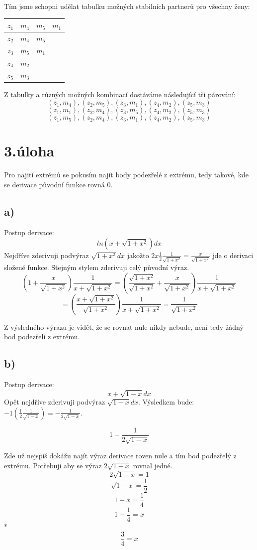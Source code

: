 \documentclass[a4paper, 11pt]{article}
\begin{document}
  Tím jsme schopni udělat tabulku možných stabilních partnerů pro všechny ženy:
  
  \begin{table}[h]
    \begin{tabular}{|l||l|l|l|}
    \hline
      $z_1$& $m_4$ & $m_5$  & $m_1$\\ \hline
      $z_2$& $m_4$ & $m_5$ &\\ \hline
      $z_3$& $m_5$ & $m_1$ &\\ \hline
      $z_4$& $m_2$ &  &\\ \hline
      $z_5$& $m_3$ &  & \\ \hline
    \end{tabular}
  \end{table}

  Z tabulky a různých možných kombinací dostáváme následující tři párování:
  $$(z_1,m_4),(z_2,m_5),(z_3,m_1),(z_4,m_2),(z_5,m_3)$$
  $$(z_1,m_1),(z_2,m_4),(z_3,m_5),(z_4,m_2),(z_5,m_3)$$
  $$(z_1,m_5),(z_2,m_4),(z_3,m_1),(z_4,m_2),(z_5,m_3)$$
  
\section*{3.úloha}
    Pro najití extrémů se pokusím najít body podezřelé z extrému, tedy takové, kde se derivace původní funkce rovná 0.
  \subsection*{a)}
    Postup derivace:
    $$ln(x+\sqrt{1+x^2}) dx$$
    Nejdříve zderivuji podvýraz $\sqrt{1+x^2} dx$ jakožto $2x\frac{1}{2} \frac{1}{\sqrt{1+x^2}} = \frac{x}{\sqrt{1+x^2}}$ jde o derivaci složené funkce. Stejným stylem zderivuji celý původní výraz.
    $$(1+\frac{x}{\sqrt{1+x^2}})\frac{1}{x+\sqrt{1+x^2}} = (\frac{\sqrt{1+x^2}}{\sqrt{1+x^2}}+\frac{x}{\sqrt{1+x^2}})\frac{1}{x+\sqrt{1+x^2}}$$
    $$ =( \frac{x + \sqrt{1+x^2}}{\sqrt{1+x^2}})\frac{1}{x+\sqrt{1+x^2}} = \frac{1}{\sqrt{1+x^2}}$$
    
    Z výsledného výrazu je vidět, že se rovnat nule nikdy nebude, není tedy žádný bod podezřelí z extrému.
    
  \subsection*{b)}
   Postup derivace:
   $$x+\sqrt{1-x} dx$$
   Opět nejdříve zderivuji podvýraz $\sqrt{1-x} dx$. Výsledkem bude: $-1(\frac{1}{2}\frac{1}{\sqrt{1-x}}) = -\frac{1}{2\sqrt{1-x}}$. 
   
   $$1-\frac{1}{2\sqrt{1-x}}$$
   
   Zde už nejspíš dokážu najít výraz derivace roven nule a tím bod podezřelý z extrému. Potřebuji aby se výraz $2\sqrt{1-x}$ rovnal jedné.
   $$2\sqrt{1-x} = 1$$
   $$\sqrt{1-x} = \frac{1}{2}$$
   $$ 1-x = \frac{1}{4}$$
   $$1-\frac{1}{4} = x$$*
   $$\frac{3}{4} = x$$ 
\end{document}
